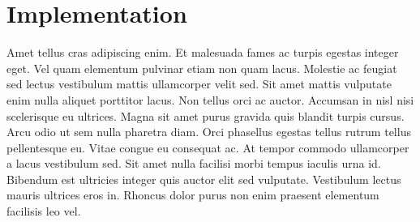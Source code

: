 
\chapter{Implementation}
\label{implementation}

Amet tellus cras adipiscing enim. Et malesuada fames ac turpis egestas integer eget. Vel quam elementum pulvinar etiam non quam lacus. Molestie ac feugiat sed lectus vestibulum mattis ullamcorper velit sed. Sit amet mattis vulputate enim nulla aliquet porttitor lacus. Non tellus orci ac auctor. Accumsan in nisl nisi scelerisque eu ultrices. Magna sit amet purus gravida quis blandit turpis cursus. Arcu odio ut sem nulla pharetra diam. Orci phasellus egestas tellus rutrum tellus pellentesque eu. Vitae congue eu consequat ac. At tempor commodo ullamcorper a lacus vestibulum sed. Sit amet nulla facilisi morbi tempus iaculis urna id. Bibendum est ultricies integer quis auctor elit sed vulputate. Vestibulum lectus mauris ultrices eros in. Rhoncus dolor purus non enim praesent elementum facilisis leo vel.